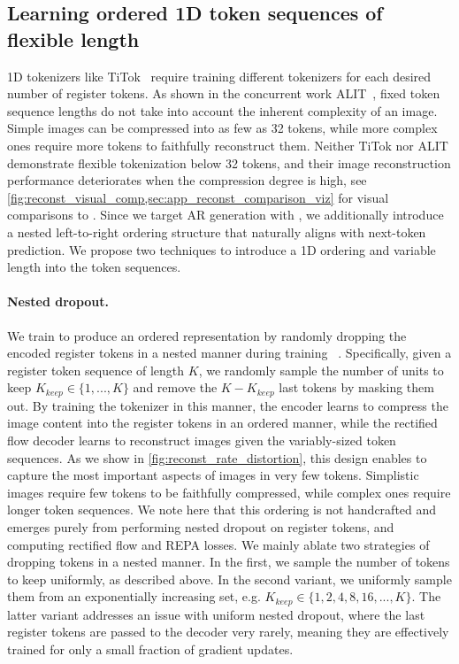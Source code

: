 \subsection{Learning ordered 1D token sequences of flexible length}
\label{sec:ordered_flex_sequences}

1D tokenizers like TiTok~\cite{yu2024titok} require training different tokenizers for each desired number of register tokens. As shown in the concurrent work ALIT~\cite{Duggal2024ALIT}, fixed token sequence lengths do not take into account the inherent complexity of an image. Simple images can be compressed into as few as 32 tokens, while more complex ones require more tokens to faithfully reconstruct them. Neither TiTok nor ALIT demonstrate flexible tokenization below 32 tokens, and their image reconstruction performance deteriorates when the compression degree is high, see \cref{fig:reconst_visual_comp,sec:app_reconst_comparison_viz} for visual comparisons to \ours. Since we target AR generation with \ours, we additionally introduce a nested left-to-right ordering structure that naturally aligns with next-token prediction. We propose two techniques to introduce a 1D ordering and variable length into the token sequences.

\paragraph{Nested dropout.} We train \ours to produce an ordered representation by randomly dropping the encoded register tokens in a nested manner during training~\cite{Rippel2014NestedDropout, Kusupati2022MatryoshkaRepr, Cai2024MatryoshkaMM} . Specifically, given a register token sequence of length $K$, we randomly sample the number of units to keep $K_{keep} \in \{1, ..., K\}$ and remove the $K-K_{keep}$ last tokens by masking them out. By training the tokenizer in this manner, the encoder learns to compress the image content into the register tokens in an ordered manner, while the rectified flow decoder learns to reconstruct images given the variably-sized token sequences. As we show in \cref{fig:reconst_rate_distortion}, this design enables \ours to capture the most important aspects of images in very few tokens. Simplistic images require few tokens to be faithfully compressed, while complex ones require longer token sequences. We note here that this ordering is not handcrafted and emerges purely from performing nested dropout on register tokens, and computing rectified flow and REPA losses. We mainly ablate two strategies of dropping tokens in a nested manner. In the first, we sample the number of tokens to keep uniformly, as described above. In the second variant, we uniformly sample them from an exponentially increasing set, e.g. $K_{keep} \in \{1, 2, 4, 8, 16, ..., K\}$. The latter variant addresses an issue with uniform nested dropout, where the last register tokens are passed to the decoder very rarely, meaning they are effectively trained for only a small fraction of gradient updates.

